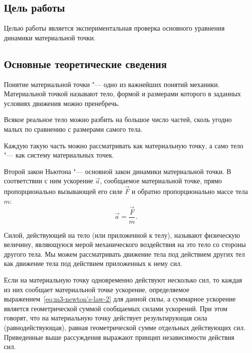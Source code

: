 \documentclass[a4paper, 12pt]{extarticle}
\begin{document}
\MTDTitlePage
\MTDInfoPage

\setcounter{section}{3}

\subsection{Цель работы}
Целью работы является экспериментальная проверка основного уравнения динамики материальной точки. 

\subsection{Основные теоретические сведения}
Понятие материальной точки "--- одно из важнейших понятий механики. Материальной точкой называют тело, формой и размерами которого в заданных условиях движения можно пренебречь.

Всякое реальное тело можно разбить на большое число частей, сколь угодно малых по сравнению с размерами самого тела.

Каждую такую часть можно рассматривать как материальную точку, а само тело "--- как систему материальных точек. 

Второй закон Ньютона "--- основной закон динамики материальной точки. В соответствии с ним ускорение $\vec{a}$, сообщаемое материальной точке, прямо пропорционально вызывающей его силе $\vec{F}$ и обратно пропорционально массе тела $m$: 
\begin{equation}
\label{eq:m3-newton's-law-2}
\vec{a} = \frac{\vec{F}}{m}.
\end{equation}

Силой, действующей на тело (или приложенной к телу), называют физическую величину, являющуюся мерой механического воздействия на это тело со стороны другого тела. Мы можем рассматривать движение тела под действием других тел как движение тела под действием приложенных к нему сил. 

Если на материальную точку одновременно действуют несколько сил, то каждая из них сообщает материальной точке ускорение, определяемое выражением~\eqref{eq:m3-newton's-law-2} для данной силы, а суммарное ускорение является геометрической суммой сообщаемых силами ускорений. При этом говорят, что на материальную точку действует результирующая сила (равнодействующая), равная геометрической сумме отдельных действующих сил. Приведенные выше рассуждения выражают принцип независимости действия сил. 
\end{document}
